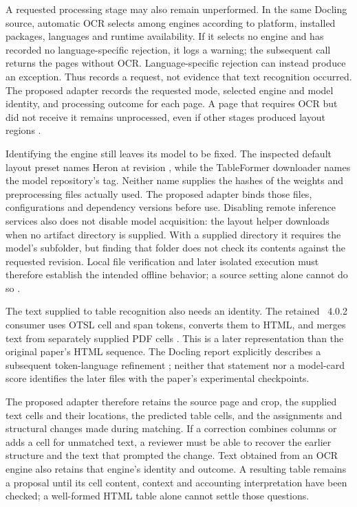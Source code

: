 A requested processing stage may also remain unperformed. In the same Docling
source, automatic OCR selects among engines according to platform, installed
packages, languages and runtime availability. If it selects no engine and has
recorded no language-specific rejection, it logs a warning; the subsequent call
returns the pages without OCR. Language-specific rejection can instead produce
an exception. Thus  records a request, not evidence that text
recognition occurred. The proposed adapter records the requested mode, selected
engine and model identity, and processing outcome for each page. A page that
requires OCR but did not receive it remains unprocessed, even if other stages
produced layout regions \citep{doclingpinned2026}.

Identifying the engine still leaves its model to be fixed. The inspected default
layout preset names Heron at revision , while the TableFormer
downloader names the model repository's  tag. Neither name supplies
the hashes of the weights and preprocessing files actually used. The proposed
adapter binds those files, configurations and dependency versions before use.
Disabling remote inference services also does not disable model acquisition:
the layout helper downloads when no artifact directory is supplied. With a
supplied directory it requires the model's subfolder, but finding that folder
does not check its contents against the requested revision. Local file
verification and later isolated execution must therefore establish the intended
offline behavior; a source setting alone cannot do so \citep{doclingpinned2026}.

The text supplied to table recognition also needs an identity. The retained
~4.0.2 consumer uses OTSL cell and span tokens, converts
them to HTML, and merges text from separately supplied PDF cells
\citep{tableformerconsumer2026}. This is a later representation than the
original paper's HTML sequence. The Docling report explicitly describes a
subsequent token-language refinement \citep[Section 3]{nassar2024}; neither
that statement nor a model-card score identifies the later files with the
paper's experimental checkpoints.

The proposed adapter therefore retains the source page and crop, the supplied
text cells and their locations, the predicted table cells, and the assignments
and structural changes made during matching. If a correction combines columns
or adds a cell for unmatched text, a reviewer must be able to recover the
earlier structure and the text that prompted the change. Text obtained from an
OCR engine also retains that engine's identity and outcome. A resulting table
remains a proposal until its cell content, context and accounting interpretation
have been checked; a well-formed HTML table alone cannot settle those questions.


